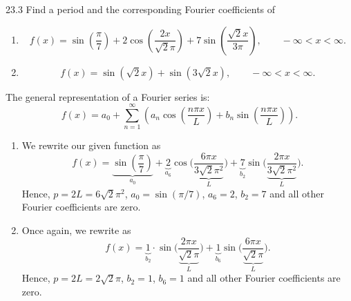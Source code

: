 \begin{problem}{23.3}
  Find a period and the corresponding Fourier coefficients of
  \begin{enumerate}
    \item
      \begin{equation*}
        f(x) = \sin \left( \frac{\pi}{7} \right) + 2 \cos \left( \frac{2x}{\sqrt{2}\pi} \right) + 7 \sin \left( \frac{\sqrt{2}x}{3\pi} \right), \qquad - \infty < x < \infty
      .\end{equation*}
    \item
      \begin{equation*}
        f(x) = \sin \left( \sqrt{2}x \right) + \sin \left( 3 \sqrt{2}x \right), \qquad -\infty < x < \infty
      .\end{equation*}
  \end{enumerate}
\end{problem}

\begin{derivation}
  The general representation of a Fourier series is:
  \begin{equation*}
    f(x) = a_0 + \sum_{n = 1}^{\infty}  \left( a_n \cos \left( \frac{n \pi x}{L} \right) + b_n \sin \left( \frac{n \pi x}{L} \right) \right)
  .\end{equation*}
  
  \begin{enumerate}
    \item We rewrite our given function as
      \begin{equation*}
        f(x) = \underbrace{\sin \left( \frac{\pi}{7} \right)}_{a_0} + \underbrace{2}_{a_6} \cos \bigg( \frac{6 \pi x}{\underbrace{3 \sqrt{2}\pi^2}_L} \bigg) + \underbrace{7}_{b_2} \sin \bigg( \frac{2 \pi x}{\underbrace{3\sqrt{2} \pi^2}_L} \bigg)
      .\end{equation*}
      Hence, $p = 2 L = 6 \sqrt{2} \pi^2$, $a_0 = \sin (\pi / 7)$, $a_6 = 2$, $b_2 = 7$ and all other Fourier coefficients are zero.
    \item Once again, we rewrite as
      \begin{equation*}
        f(x) = \underbrace{1}_{b_2} \cdot \sin \bigg( \frac{2\pi x}{ \underbrace{\sqrt{2}\pi}_{L}} \bigg) + \underbrace{1}_{b_6} \sin \bigg( \frac{6 \pi x}{\underbrace{\sqrt{2}\pi}_{L}} \bigg) 
      .\end{equation*}
      Hence, $p = 2L = 2 \sqrt{2} \pi$, $b_2 = 1$, $b_6 = 1$ and all other Fourier coefficients are zero.
  \end{enumerate}
\end{derivation}

